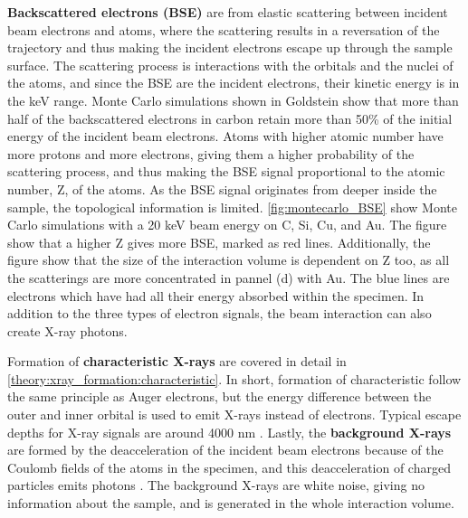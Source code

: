 \textbf{Backscattered electrons (BSE)} are from elastic scattering between incident beam electrons and atoms, where the scattering results in a reversation of the trajectory and thus making the incident electrons escape up through the sample surface.
The scattering process is interactions with the orbitals and the nuclei of the atoms, and since the BSE are the incident electrons, their kinetic energy is in the keV range.
Monte Carlo simulations shown in Goldstein \cite[Fig. 2.16 b]{goldstein_scanning_2018} show that more than half of the backscattered electrons in carbon retain more than 50\% of the initial energy of the incident beam electrons.
Atoms with higher atomic number have more protons and more electrons, giving them a higher probability of the scattering process, and thus making the BSE signal proportional to the atomic number, Z, of the atoms.
As the BSE signal originates from deeper inside the sample, the topological information is limited.
\cref{fig:montecarlo_BSE} show Monte Carlo simulations with a 20 keV beam energy on C, Si, Cu, and Au.
The figure show that a higher Z gives more BSE, marked as red lines.
Additionally, the figure show that the size of the interaction volume is dependent on Z too, as all the scatterings are more concentrated in pannel (d) with Au.
The blue lines are electrons which have had all their energy absorbed within the specimen.
In addition to the three types of electron signals, the beam interaction can also create X-ray photons.


Formation of \textbf{characteristic X-rays} are covered in detail in \cref{theory:xray_formation:characteristic}.
In short, formation of characteristic follow the same principle as Auger electrons, but the energy difference between the outer and inner orbital is used to emit X-rays instead of electrons.
Typical escape depths for X-ray signals are around 4000 nm \cite{hollas_modern_2004}.
Lastly, the \textbf{background X-rays} are formed by the deacceleration of the incident beam electrons because of the Coulomb fields of the atoms in the specimen, and this deacceleration of charged particles emits photons \cite{notaros_electromagnetics_2010}.
The background X-rays are white noise, giving no information about the sample, and is generated in the whole interaction volume.



